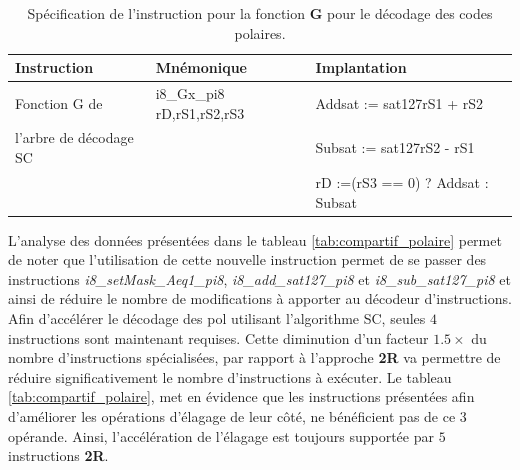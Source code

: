 \documentclass[../main.tex]{subfiles}
\begin{document}
  \begin{table}[!tb]
    \centering
    \footnotesize
      \begin{tabular}{l || l l }
      \hline
        \textbf{Instruction} & \textbf{Mnémonique}              & \textbf{Implantation} \\ 
        \hline                   
        Fonction G de           &i8\_Gx\_pi8 rD,rS1,rS2,rS3     & Addsat := sat127{rS1 + rS2} \\
        l'arbre de décodage SC  &                               & Subsat := sat127{rS2 - rS1} \\
                                &                               & rD \hspace{6mm} :=(rS3 == 0) ? Addsat : Subsat   \\
        \hline
      \end{tabular}
    \caption{Spécification de l'instruction pour la fonction \textbf{G} pour le décodage des codes polaires.}
    \label{tab:instrus_polar_3reg}
    \end{table}
L'analyse des données présentées dans le tableau \ref{tab:compartif_polaire} permet de noter que l'utilisation de cette nouvelle instruction permet de se passer des instructions \textit{i8\_setMask\_Aeq1\_pi8}, \textit{i8\_add\_sat127\_pi8} et \textit{i8\_sub\_sat127\_pi8} et ainsi de réduire le nombre de modifications à apporter au décodeur d'instructions.
Afin d'accélérer le décodage des \acrlong{pol} utilisant l'algorithme SC, seules $4$ instructions sont maintenant requises.
Cette diminution d'un facteur $1.5\times$ du nombre d'instructions spécialisées, par rapport à l'approche \textbf{2R} va permettre de réduire significativement le nombre d'instructions à exécuter.
Le tableau \ref{tab:compartif_polaire}, met en évidence que les instructions présentées afin d'améliorer les opérations d'élagage de leur côté, ne bénéficient pas de ce 3 opérande. Ainsi, l'accélération de l'élagage est toujours supportée par $5$ instructions \textbf{2R}.
\end{document}
